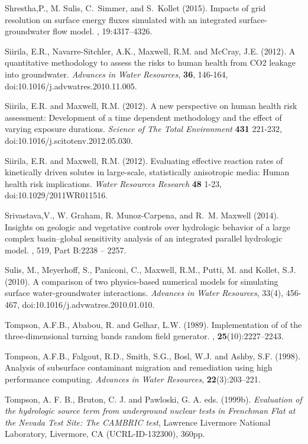\begin{thebibliography}{999}
Shrestha,P., M. Sulis, C.~Simmer, and S.~Kollet (2015).
\newblock Impacts of grid resolution on surface energy fluxes simulated with an
  integrated surface-groundwater flow model.
, 19:4317--4326.

Siirila, E.R., Navarre-Sitchler, A.K., Maxwell, R.M. and McCray, J.E. (2012). A quantitative methodology to assess the risks to human health from CO2 leakage into groundwater. {\em Advances in Water Resources}, {\bf 36}, 146-164, doi:10.1016/j.advwatres.2010.11.005.

Siirila, E.R. and Maxwell, R.M. (2012). A new perspective on human health risk assessment: Development of a time dependent methodology and the effect of varying exposure durations. {\em Science of The Total Environment} {\bf 431} 221-232, doi:10.1016/j.scitotenv.2012.05.030.

Siirila, E.R. and Maxwell, R.M. (2012). Evaluating effective reaction rates of kinetically driven solutes in large-scale, statistically anisotropic media: Human health risk implications. {\em Water Resources Research} {\bf 48} 1-23, doi:10.1029/2011WR011516.

Srivastava,V., W. Graham, R. Munoz-Carpena, and R.~M. Maxwell (2014).
\newblock Insights on geologic and vegetative controls over hydrologic behavior
  of a large complex basin--global sensitivity analysis of an integrated
  parallel hydrologic model.
, 519, Part B:2238 -- 2257.


Sulis, M., Meyerhoff, S., Paniconi, C., Maxwell, R.M., Putti, M. and Kollet, S.J. (2010). A comparison of two physics-based numerical models for simulating surface water-groundwater interactions. { \em Advances in Water Resources}, 33(4), 456-467, doi:10.1016/j.advwatres.2010.01.010.

Tompson, A.F.B., Ababou, R. and Gelhar, L.W. (1989).
\newblock Implementation of of the three-dimensional turning bands random field
  generator.
, {\bf 25}(10):2227--2243.

  Tompson, A.F.B., Falgout, R.D., Smith, S.G., Bosl, W.J. and
Ashby, S.F. (1998). Analysis of subsurface contaminant migration and
remediation using high performance computing. {\em Advances in Water
Resources}, { \bf 22}(3):203--221.

Tompson, A. F. B., Bruton, C. J. and Pawloski,  G. A. eds. (1999b). {\em Evaluation of the hydrologic source term from underground nuclear tests in Frenchman Flat at the Nevada Test Site: The CAMBRIC test}, Lawrence Livermore National Laboratory, Livermore, CA (UCRL-ID-132300), 360pp. 


\end{thebibliography}

